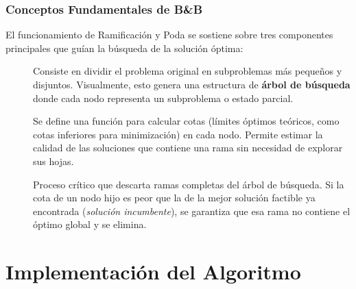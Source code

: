 \documentclass[aspectratio=169]{beamer}
\begin{document}
\begin{frame}[fragile]
    \frametitle{Conceptos Fundamentales de B\&B}
    \justifying
    El funcionamiento de Ramificación y Poda se sostiene sobre tres componentes principales que guían la búsqueda de la solución óptima:
    
    \begin{description}
        \item[] Consiste en dividir el problema original en subproblemas más pequeños y disjuntos. Visualmente, esto genera una estructura de \textbf{árbol de búsqueda} donde cada nodo representa un subproblema o estado parcial.
        
        \item[] Se define una función para calcular cotas (límites óptimos teóricos, como cotas inferiores para minimización) en cada nodo. Permite estimar la calidad de las soluciones que contiene una rama sin necesidad de explorar sus hojas.
        
        \item[] Proceso crítico que descarta ramas completas del árbol de búsqueda. Si la cota de un nodo hijo es peor que la de la mejor solución factible ya encontrada (\emph{solución incumbente}), se garantiza que esa rama no contiene el óptimo global y se elimina.
    \end{description}
\end{frame}

\section{Implementación del Algoritmo}
\end{document}
